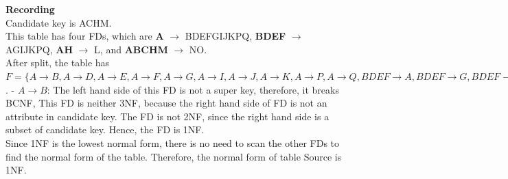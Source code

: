 \textbf{Recording}\\
Candidate key is ACHM.\\
This table has four FDs, which are \textbf{A} $\rightarrow$ BDEFGIJKPQ, \textbf{BDEF} $\rightarrow$ AGIJKPQ, \textbf{AH} $\rightarrow$ L, and \textbf{ABCHM} $\rightarrow$ NO.\\
After split, the table has $F=\{A \rightarrow B, A \rightarrow D, A \rightarrow E, A \rightarrow F, A \rightarrow G, A \rightarrow I, A \rightarrow J, A \rightarrow K, A \rightarrow P, A \rightarrow Q, BDEF \rightarrow A, BDEF \rightarrow G, BDEF \rightarrow I, BDEF \rightarrow J, BDEF \rightarrow K, BDEF \rightarrow P, BDEF \rightarrow Q, AH \rightarrow L, ABCHM \rightarrow N, ABCHM \rightarrow O\}$.
- $A \rightarrow B$: The left hand side of this FD is not a super key, therefore, it breaks BCNF, This FD is neither 3NF, because the right hand side of FD is not an attribute in candidate key. The FD is not 2NF, since the right hand side is a subset of candidate key. Hence, the FD is 1NF.\\
Since 1NF is the lowest normal form, there is no need to scan the other FDs to find the normal form of the table. Therefore, the normal form of table Source is 1NF.\\
